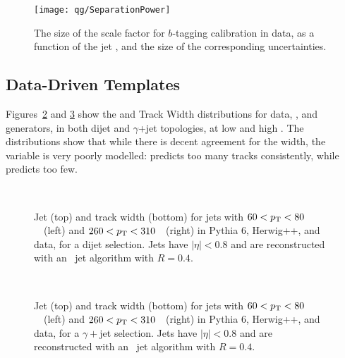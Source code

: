 
\begin{figure}
\centering
\texttt{[image: qg/SeparationPower]}
\label{fig:jet-reconstruction:qg:separation}
\caption{The size of the scale factor for $b$-tagging calibration in data, as a function of the jet \pt, and the size of the corresponding uncertainties.}
\end{figure}


\subsection{Data-Driven Templates}

Figures~\ref{fig:jet-reconstruction:qg:dijetProperties} and \ref{fig:jet-reconstruction:qg:gammajetProperties} show the \ntrk and Track Width distributions for data, \Pythia, and \Herwigpp generators, in both dijet and $\gamma$+jet topologies, at low \pt and high \pt. The distributions show that while there is decent agreement for the width, the \ntrk variable is very poorly modelled: \Pythia predicts too many tracks consistently, while \Herwigpp predicts too few. 

\begin{figure}[tbp]
\begin{center}
 \\
\caption{
Jet \ntrk (top) and track width (bottom) for jets with $60<p_{\text{T}}<80$~\GeV\ (left) and
$260<p_{\text{T}}<310$~\GeV\ (right) in {\sc Pythia} 6, {\sc Herwig++}, and data, for a dijet selection.
Jets have $|\eta|<0.8$ and are reconstructed with an \AKT\ jet algorithm with $R=0.4$.
 }
\label{fig:jet-reconstruction:qg:dijetProperties}
\end{center}
\end{figure}

\begin{figure}[tbp]
\begin{center}
 \\
\caption{
Jet \ntrk (top) and track width (bottom) for jets with $60<p_{\text{T}}<80$~\GeV\ (left) and
$260<p_{\text{T}}<310$~\GeV\ (right) in {\sc Pythia} 6, {\sc Herwig++}, and data, for a $\gamma+$jet selection.
Jets have $|\eta|<0.8$ and are reconstructed with an \AKT\ jet algorithm with $R=0.4$.
 }
\label{fig:jet-reconstruction:qg:gammajetProperties}
\end{center}
\end{figure}

